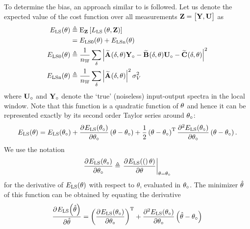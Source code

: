 To determine the bias, an approach similar to \citep[Appendix A]{Guillaume1995} is followed.
Let us denote the expected value of the cost function over all measurements $\LocalVector{Z} = \mat{\LocalMatrix{Y}, \LocalMatrix{U}}$ as
\begin{align}
  \ELSCost{\theta}
              & \isdef 
                   \E[\LocalVector{Z}]%
                         {    
                                \LSCost{\LocalVector{\theta}, \LocalVector{Z}}} \\
              & = \ELSCost[0]{\theta} + \ELSCost[n]{\theta} \\
    \ELSCost[0]{\theta} & \isdef 
            \frac{1}{\nWind} 
                \sum_{\dW} 
                     \left| 
                             \LocalModel{A}(\dW, \LocalVector{\theta}) \true{\LocalVector{Y}}
                          - \LocalModel{B}(\dW, \LocalVector{\theta}) \true{\LocalVector{U}}
                          - \LocalModel{C}(\dW, \LocalVector{\theta}) 
                    \right|^2 \\
    \ELSCost[n]{\theta} & \isdef 
              \frac{1}{\nWind} 
                     \sum_{\dW} 
                              \left| \LocalModel{A}(\dW,\LocalVector{\theta}) \right|^2 
                              \sigma_V^2
\end{align}
where $\true{\LocalVector{U}}$ and $\true{\LocalVector{Y}}$ denote the `true' (noiseless) input-output spectra in the local window.
Note that this function is a quadratic function of $\LocalVector{\theta}$ and hence it can be represented exactly by its second order Taylor series around $\true\theta$:
\begin{multline}
  \ELSCost{\theta} = \ELSCost{\true\theta} 
  + \PartialDerivative{\ELSCost{\true\theta}}{\true\theta}  \left( \theta - \true\theta \right) %
  + \frac{1}{2} \left( \theta - \true\theta \right)^{\T} 
  \PartialDerivative[2]{\ELSCost{\true\theta}}{\true\theta} 
   \left( \theta - \true\theta \right)
   \text{.}
\end{multline}
We use the notation
\begin{equation}
  \PartialDerivative{\ELSCost{\true\theta}}{\true\theta}
  \isdef
  \evaluate{\PartialDerivative{\ELSCost(\theta)}{\theta}}{\theta = \true\theta}
\end{equation}
for the derivative of $\ELSCost{\theta}$ with respect to $\theta$, evaluated in $\true\theta$.
The minimizer $\estimated\theta$ of this function can be obtained by equating the derivative
\begin{equation}
  \PartialDerivative{\ELSCost{\estimated\theta}}
                                          {\estimated\theta} 
  = 
  \left( \PartialDerivative{\ELSCost{\true\theta}}{\true\theta} \right)^{\T} 
  + \PartialDerivative[2]{\ELSCost{\true\theta}}{\true\theta} \left( \estimated\theta - \true\theta \right)
\end{equation}
